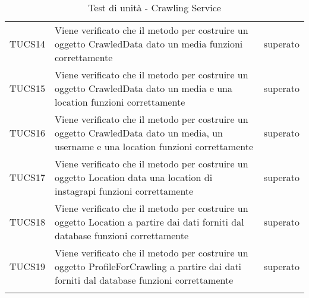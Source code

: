 \begin{longtable}{ m{}<{\centering}  m{}<{\centering}  m{}<{\centering} }
    TUCS14 & Viene verificato che il metodo per costruire un oggetto CrawledData dato un media funzioni correttamente & superato \\
    TUCS15 & Viene verificato che il metodo per costruire un oggetto CrawledData dato un media e una location funzioni correttamente & superato \\
    TUCS16 & Viene verificato che il metodo per costruire un oggetto CrawledData dato un media, un username e una location funzioni correttamente & superato \\
    TUCS17 & Viene verificato che il metodo per costruire un oggetto Location data una location di instagrapi funzioni correttamente & superato \\
    TUCS18 & Viene verificato che il metodo per costruire un oggetto Location a partire dai dati forniti dal database funzioni correttamente & superato \\
    TUCS19 & Viene verificato che il metodo per costruire un oggetto ProfileForCrawling a partire dai dati forniti dal database funzioni correttamente & superato \\
    \caption{Test di unità - Crawling Service}
\end{longtable}	

